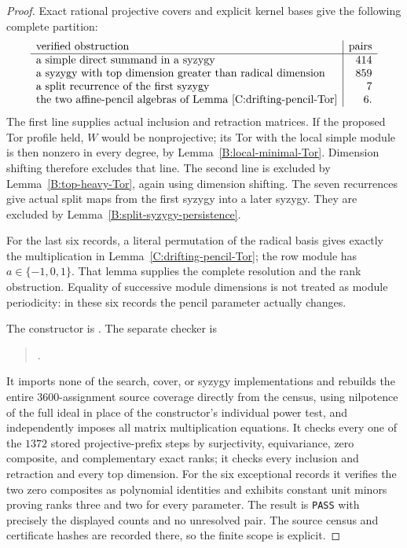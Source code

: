 \begin{proof}
Exact rational projective covers and explicit kernel bases give
the following complete partition:
\[
\begin{array}{l|r}
 \text{verified obstruction}&\text{pairs}\\\hline
 \text{a simple direct summand in a syzygy}&414\\
 \text{a syzygy with top dimension greater than radical dimension}&859\\
 \text{a split recurrence of the first syzygy}&7\\
 \text{the two affine-pencil algebras of Lemma~\ref{C:drifting-pencil-Tor}}&6.
\end{array}
\]
The first line supplies actual inclusion and retraction matrices.
If the proposed Tor profile held, $W$ would be nonprojective;
its Tor with the local simple module is then nonzero in every
degree, by Lemma~\ref{B:local-minimal-Tor}.  Dimension shifting
therefore excludes that line.  The second line is excluded by
Lemma~\ref{B:top-heavy-Tor}, again using dimension shifting.
The seven recurrences give actual split maps from the first
syzygy into a later syzygy.  They are excluded by
Lemma~\ref{B:split-syzygy-persistence}.

For the last six records, a literal permutation of the radical
basis gives exactly the multiplication in
Lemma~\ref{C:drifting-pencil-Tor}; the row module has
$a\in\{-1,0,1\}$.  That lemma supplies the complete resolution
and the rank obstruction.  Equality of successive module
dimensions is not treated as module periodicity: in these six
records the pencil parameter actually changes.

The constructor is .
The separate checker is
\begin{quote}\small
{}.
\end{quote}
It imports none of the search, cover, or syzygy implementations
and rebuilds the
entire $3600$-assignment source coverage directly from the
census, using nilpotence of the full ideal in place of the
constructor's individual power test, and independently imposes
all matrix multiplication equations.  It checks every one of
the $1372$ stored projective-prefix steps by surjectivity,
equivariance, zero composite, and complementary exact ranks;
it checks every inclusion and retraction and every top dimension.
For the six exceptional records it verifies the two zero
composites as polynomial identities and exhibits constant unit
minors proving ranks three and two for every parameter.
The result
is \texttt{PASS} with precisely the displayed counts and no
unresolved pair.  The source census and certificate hashes
are recorded there, so the finite scope is explicit.
\end{proof}

